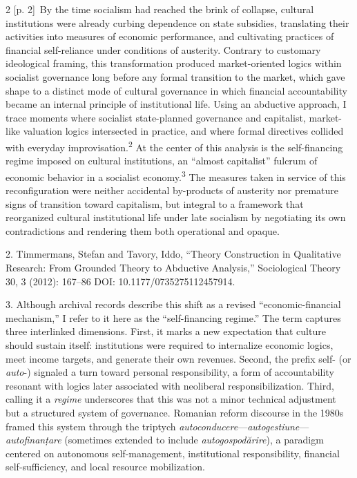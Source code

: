 \documentclass[10pt,a4paper]{article}
\begin{document}
\begin{paracol}{2}
{\scriptsize\color{gray} [p. 2]}\ By the time socialism had reached the brink of collapse, cultural institutions were already curbing dependence on state subsidies, translating their activities into measures of economic performance, and cultivating practices of financial self-reliance under conditions of austerity. Contrary to customary ideological framing, this transformation produced market-oriented logics within socialist governance long before any formal transition to the market, which gave shape to a distinct mode of cultural governance in which financial accountability became an internal principle of institutional life. Using an abductive approach, I trace moments where socialist state-planned governance and capitalist, market-like valuation logics intersected in practice, and where formal directives collided with everyday improvisation.\nobreak\textsuperscript{2} At the center of this analysis is the self-financing regime imposed on cultural institutions, an “almost capitalist” fulcrum of economic behavior in a socialist economy.\nobreak\textsuperscript{3} The measures taken in service of this reconfiguration were neither accidental by-products of austerity nor premature signs of transition toward capitalism, but integral to a framework that reorganized cultural institutional life under late socialism by negotiating its own contradictions and rendering them both operational and opaque.\par{\small 2. Timmermans, Stefan and Tavory, Iddo, “Theory Construction in Qualitative Research: From Grounded Theory to Abductive Analysis,” Sociological Theory 30, 3 (2012): 167–86 DOI: 10.1177/0735275112457914.\par}{\small 3. Although archival records describe this shift as a revised “economic-financial mechanism,” I refer to it here as the “self-financing regime.” The term captures three interlinked dimensions. First, it marks a new expectation that culture should sustain itself: institutions were required to internalize economic logics, meet income targets, and generate their own revenues. Second, the prefix self- (or \textit{auto}-) signaled a turn toward personal responsibility, a form of accountability resonant with logics later associated with neoliberal responsibilization. Third, calling it a \textit{regime} underscores that this was not a minor technical adjustment but a structured system of governance. Romanian reform discourse in the 1980s framed this system through the triptych \textit{autoconducere}—\textit{autogestiune}—\textit{autofinanțare} (sometimes extended to include \textit{autogospodărire}), a paradigm centered on autonomous self-management, institutional responsibility, financial self-sufficiency, and local resource mobilization.\par}

\end{paracol}
\end{document}
